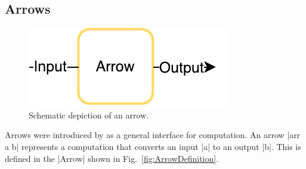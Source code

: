 \subsection{Arrows}
\label{sec:arrows}
\begin{figure}[h]
	\includegraphics{images/arrow}
	\caption{Schematic depiction of an arrow.}
\end{figure}
Arrows were introduced by \citet{HughesArrows} as a general interface for computation. An arrow |arr a b| represents  a computation that converts an input |a| to an output |b|. This is defined in the |Arrow| shown in Fig.~\ref{fig:ArrowDefinition}.

